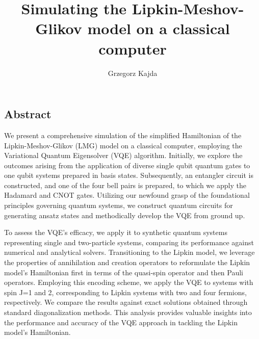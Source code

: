 \documentclass[onecolumn,10pt,cleanfoot]{asme2ej}
\author{Grzegorz Kajda
    \affiliation{
	Bachelor Student, Robotics and Intelligent Systems\\ \\[-10pt]
	Department of Informatics The faculty of Mathematics and Natural Sciences\\ \\[-10pt]
    Email: grzegork@ifi.uio.no
    }
}
\begin{document}
\title{Simulating the Lipkin-Meshov-Glikov model on a classical computer}

\maketitle

\begin{center}
\section{Abstract}

We present a comprehensive simulation of the simplified Hamiltonian of the Lipkin-Meshov-Glikov (LMG) model on a classical computer, employing the Variational Quantum Eigensolver (VQE) algorithm. Initially, we explore the outcomes arising from the application of diverse single qubit quantum gates to one qubit systems prepared in basis states. Subsequently, an entangler circuit is constructed, and one of the four bell pairs is prepared, to which we apply the Hadamard and CNOT gates. Utilizing our newfound grasp of the foundational principles governing quantum systems, we construct quantum circuits for generating ansatz states and methodically develop the VQE from ground up.

To assess the VQE's efficacy, we apply it to synthetic quantum systems representing single and two-particle systems, comparing its performance against numerical and analytical solvers. Transitioning to the Lipkin model, we leverage the properties of annihilation and creation operators to reformulate the Lipkin model's Hamiltonian first in terms of the quasi-spin operator and then Pauli operators. Employing this encoding scheme, we apply the VQE to systems with spin J=1 and 2, corresponding to Lipkin systems with two and four fermions, respectively. We compare the results against exact solutions obtained through standard diagonalization methods. This analysis provides valuable insights into the performance and accuracy of the VQE approach in tackling the Lipkin model's Hamiltonian.
	
\end{center}
\end{document}
